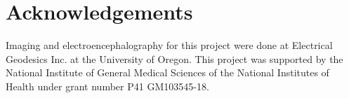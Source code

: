 %   

\section{Acknowledgements}
\label{sec:acknowl}

Imaging and electroencephalography for this project were done at Electrical Geodesics Inc. at the University of Oregon. This project was supported by the National Institute of General Medical Sciences of the National Institutes of Health under grant number P41 GM103545-18. 